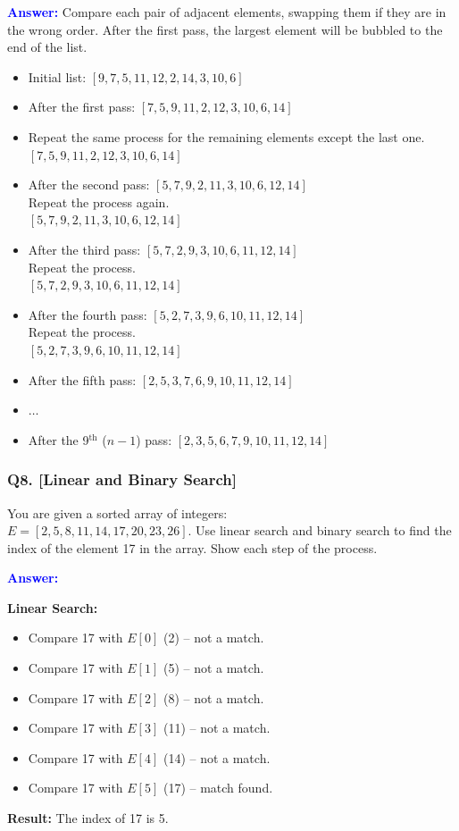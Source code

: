 \textcolor{blue}{\textbf{Answer:}} Compare each pair of adjacent elements, swapping them if they are in the wrong order. After the first pass, the largest element will be bubbled to the end of the list.

\begin{itemize}
    \item Initial list: $[9, 7, 5, 11, 12, 2, 14, 3, 10, 6]$
    \item After the first pass: $[7, 5, 9, 11, 2, 12, 3, 10, 6, 14]$
    \item Repeat the same process for the remaining elements except the last one.\\
          $[7, 5, 9, 11, 2, 12, 3, 10, 6, 14]$
    \item After the second pass: $[5, 7, 9, 2, 11, 3, 10, 6, 12, 14]$\\
          Repeat the process again.\\
          $[5, 7, 9, 2, 11, 3, 10, 6, 12, 14]$
    \item After the third pass: $[5, 7, 2, 9, 3, 10, 6, 11, 12, 14]$\\
          Repeat the process.\\
          $[5, 7, 2, 9, 3, 10, 6, 11, 12, 14]$
    \item After the fourth pass: $[5, 2, 7, 3, 9, 6, 10, 11, 12, 14]$\\
          Repeat the process.\\
          $[5, 2, 7, 3, 9, 6, 10, 11, 12, 14]$
    \item After the fifth pass: $[2, 5, 3, 7, 6, 9, 10, 11, 12, 14]$
    \item $\ldots$
    \item After the 9$^{\text{th}}$ ($n-1$) pass: $[2, 3, 5, 6, 7, 9, 10, 11, 12, 14]$
\end{itemize}

\subsubsection{Q8. [Linear and Binary Search]}
You are given a sorted array of integers: \\
$E = [2, 5, 8, 11, 14, 17, 20, 23, 26]$. Use linear search and binary search to find the index of the element 17 in the array. Show each step of the process.

\textcolor{blue}{\textbf{Answer:}}

\textbf{Linear Search:}
\begin{itemize}
    \item Compare 17 with $E[0]$ (2) -- not a match.
    \item Compare 17 with $E[1]$ (5) -- not a match.
    \item Compare 17 with $E[2]$ (8) -- not a match.
    \item Compare 17 with $E[3]$ (11) -- not a match.
    \item Compare 17 with $E[4]$ (14) -- not a match.
    \item Compare 17 with $E[5]$ (17) -- match found.
\end{itemize}
\textbf{Result:} The index of 17 is 5.


